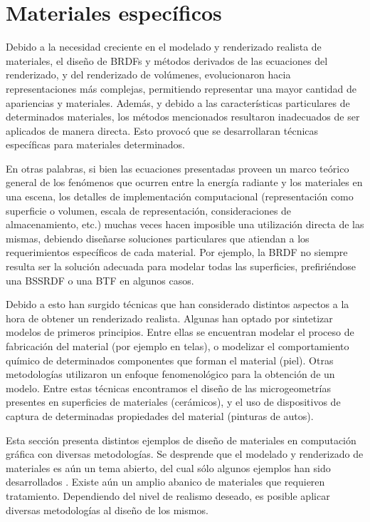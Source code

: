 \section{Materiales específicos}
Debido a la necesidad creciente en el modelado y renderizado realista de materiales, el diseño de BRDFs y métodos derivados de las ecuaciones del renderizado, y del renderizado de volúmenes, evolucionaron hacia representaciones más complejas, permitiendo representar una mayor cantidad de apariencias y materiales.
Además, y debido a las características particulares de determinados materiales, los métodos mencionados resultaron inadecuados de ser aplicados de manera directa.
Esto provocó que se desarrollaran técnicas específicas para materiales determinados.

En otras palabras, si bien las ecuaciones presentadas proveen un marco teórico general de los fenómenos que ocurren entre la energía radiante y los materiales en una escena, los detalles de implementación computacional (representación como superficie o volumen, escala de representación, consideraciones de almacenamiento, etc.) muchas veces hacen imposible una utilización directa de las mismas, debiendo diseñarse soluciones particulares que atiendan a los requerimientos específicos de cada material.
Por ejemplo, la BRDF no siempre resulta ser la solución adecuada para modelar todas las superficies, prefiriéndose una BSSRDF o una BTF en algunos casos.

Debido a esto han surgido técnicas que han considerado distintos aspectos a la hora de obtener un renderizado realista.
Algunas han optado por sintetizar modelos de primeros principios. 
Entre ellas se encuentran modelar el proceso de fabricación del material (por ejemplo en telas), o modelizar el comportamiento químico de determinados componentes que forman el material (piel).
Otras metodologías utilizaron un enfoque fenomenológico para la obtención de un modelo.
Entre estas técnicas encontramos el diseño de las microgeometrías presentes en superficies de materiales (cerámicos), y el uso de dispositivos de captura de determinadas propiedades del material (pinturas de autos). 


Esta sección presenta distintos ejemplos de diseño de materiales en computación gráfica con diversas metodologías.
Se desprende que el modelado y renderizado de materiales es aún un tema abierto, del cual sólo algunos ejemplos han sido desarrollados \cite{Dorsey2007}.
Existe aún un amplio abanico de materiales que requieren tratamiento.
Dependiendo del nivel de realismo deseado, es posible aplicar diversas metodologías al diseño de los mismos.


